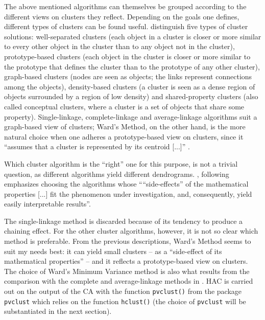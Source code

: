 The above mentioned algorithms can themselves be grouped according to the different views on clusters they reflect. Depending on the goals one defines, different types of clusters can be found useful. \citet[493--495]{tan_introduction_2006} distinguish five types of cluster solutions: well-separated clusters (each object in a cluster is closer or more similar to every other object in the cluster than to any object not in the cluster), prototype-based clusters (each object in the cluster is closer or more similar to the prototype that defines the cluster than to the prototype of any other cluster), graph-based clusters (nodes are seen as objects; the links represent connections among the objects), density-based clusters (a cluster is seen as a dense region of objects surrounded by a region of low density) and shared-property clusters (also called conceptual clusters, where a cluster is a set of objects that share some property). Single-linkage, complete-linkage and average-linkage algorithms suit a graph-based view of clusters; Ward’s Method, on the other hand, is the more natural choice when one adheres a prototype-based view on clusters, since it “assumes that a cluster is represented by its centroid [...]” \citep[517]{tan_introduction_2006}.

Which cluster algorithm is the ``right'' one for this purpose, is not a trivial question, as different algorithms yield different dendrograms. \citet[132]{divjak_structuring_2010}, following \citet[35]{speece_cluster_1994} emphasizes choosing the algorithms whose “``side-effects'' of the mathematical properties [...] fit the phenomenon under investigation, and, consequently, yield easily interpretable results”. 

The single-linkage method is discarded because of its tendency to produce a chaining effect. For the other cluster algorithms, however, it is not so clear which method is preferable. From the previous descriptions, Ward’s Method seems to suit my needs best: it can yield small clusters – as a “side-effect of its mathematical properties” – and it reflects a prototype-based view on clusters. The choice of Ward’s Minimum Variance method is also what results from the comparison with the complete and average-linkage methods in . HAC is carried out on the output of the CA with the function \texttt{pvclust()} from the package \texttt{pvclust} which relies on the function \texttt{hclust()} (the choice of \texttt{pvclust} will be substantiated in the next section).

